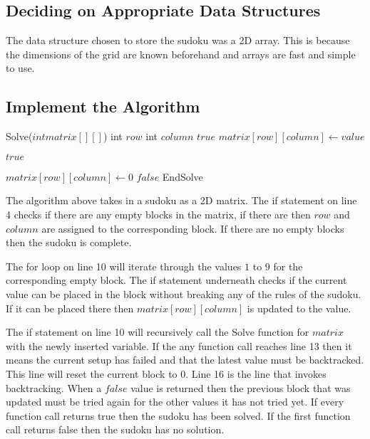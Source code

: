 \documentclass{article}
\begin{document}
\subsection{Deciding on Appropriate Data Structures}
The data structure chosen to store the sudoku was a 2D array. This is because the dimensions of the grid are known beforehand and arrays are fast and simple to use.

\subsection{Implement the Algorithm}

    \begin{algorithmic}[1]
    
    \STATE Solve($int matrix[][]$)
        \STATE int $row$
        \STATE int $column$
\newline
            \RETURN $true$
        \ENDIF
\newline
                \STATE $matrix[row][column]\gets value$
            
                    \RETURN $true$
                \ENDIF
                
                \STATE $matrix[row][column]\gets 0$
            \ENDIF
        \ENDFOR
\newline
        \RETURN $false$
    \STATE EndSolve
\newline
    \end{algorithmic}

The algorithm above takes in a sudoku as a 2D matrix. The if statement on line 4 checks if there are any empty blocks in the matrix, if there are then $row$ and $column$ are assigned to the corresponding block. If there are no empty blocks then the sudoku is complete. 

The for loop on line 10 will iterate through the values $1$ to $9$ for the corresponding empty block. The if statement underneath checks if the current value can be placed in the block without breaking any of the rules of the sudoku. If it can be placed there then $matrix[row][column]$ is updated to the value.

The if statement on line 10 will recursively call the Solve function for $matrix$ with the newly inserted variable.
If the any function call reaches line 13 then it means the current setup has failed and that the latest value must be backtracked. This line will reset the current block to 0. Line 16 is the line that invokes backtracking. When a $false$ value is returned then the previous block that was updated must be tried again for the other values it has not tried yet. If every function call returns true then the sudoku has been solved. If the first function call returns false then the sudoku has no solution.
\end{document}
